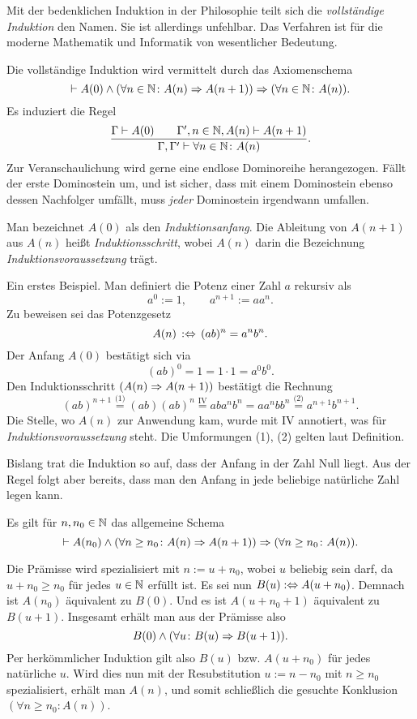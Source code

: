 Mit der bedenklichen Induktion in der Philosophie teilt sich die
\emph{vollständige Induktion} den Namen. Sie ist allerdings unfehlbar.
Das Verfahren ist für die moderne Mathematik und Informatik von
wesentlicher Bedeutung.

Die vollständige Induktion wird vermittelt durch das Axiomenschema
\[\vdash A(0)\land (\forall n\in\mathbb N\colon A(n)\Rightarrow A(n+1))
\Rightarrow (\forall n\in\mathbb N\colon A(n)).\]
Es induziert die Regel
\[\dfrac{\Gamma\vdash A(0)\qquad\Gamma',n\in\mathbb N,A(n)\vdash A(n+1)}{
\Gamma,\Gamma'\vdash\forall n\in\mathbb N\colon A(n)}.\]
Zur Veranschaulichung wird gerne eine endlose Dominoreihe herangezogen.
Fällt der erste Dominostein um, und ist sicher, dass mit einem
Dominostein ebenso dessen Nachfolger umfällt, muss \emph{jeder}
Dominostein irgendwann umfallen.

Man bezeichnet $A(0)$ als den \emph{Induktionsanfang}.
Die Ableitung von $A(n+1)$ aus $A(n)$ heißt \emph{Induktionsschritt},
wobei $A(n)$ darin die Bezeichnung \emph{Induktionsvoraussetzung} trägt.

Ein erstes Beispiel. Man definiert die Potenz einer Zahl $a$ rekursiv als
\[a^0 := 1,\qquad a^{n+1} := aa^n.\]
Zu beweisen sei das Potenzgesetz
\[A(n)\,:\Leftrightarrow\, (ab)^n = a^n b^n.\]
Der Anfang $A(0)$ bestätigt sich via
\[(ab)^0 = 1 = 1\cdot 1 = a^0 b^0.\]
Den Induktionsschritt $(A(n)\Rightarrow A(n+1))$ bestätigt
die Rechnung
\[(ab)^{n+1}\stackrel{\text{(1)}}= (ab)(ab)^n
\stackrel{\text{IV}}= aba^n b^n = aa^n bb^n
\stackrel{\text{(2)}}= a^{n+1} b^{n+1}.\]
Die Stelle, wo $A(n)$ zur Anwendung kam, wurde mit IV annotiert,
was für \emph{Induktionsvoraussetzung} steht. Die Umformungen
(1), (2) gelten laut Definition.

Bislang trat die Induktion so auf, dass der Anfang in der
Zahl Null liegt. Aus der Regel folgt aber bereits, dass man den
Anfang in jede beliebige natürliche Zahl legen kann.
\begin{Satz}
Es gilt für $n,n_0\in\mathbb N$ das allgemeine Schema
\[\vdash A(n_0)\land (\forall n\ge n_0\colon A(n)\Rightarrow A(n+1))
\Rightarrow (\forall n\ge n_0\colon A(n)).\]
\end{Satz}
\begin{Beweis}
Die Prämisse wird spezialisiert mit $n:=u+n_0$, wobei $u$ beliebig sein
darf, da $u+n_0\ge n_0$ für jedes $u\in\mathbb N$
erfüllt ist. Es sei nun $B(u):\Leftrightarrow A(u+n_0)$. Demnach ist
$A(n_0)$ äquivalent zu $B(0)$. Und es ist $A(u+n_0+1)$ äquivalent
zu $B(u+1)$. Insgesamt erhält man aus der Prämisse also
\[B(0)\land (\forall u\colon B(u)\Rightarrow B(u+1)).\]
Per herkömmlicher Induktion gilt also $B(u)$ bzw. $A(u+n_0)$ für
jedes natürliche $u$. Wird dies nun mit der Resubstitution $u:=n-n_0$
mit $n\ge n_0$ spezialisiert, erhält man $A(n)$, und somit schließlich die
gesuchte Konklusion $(\forall n\ge n_0\colon A(n))$.\,\qedsymbol
\end{Beweis}

